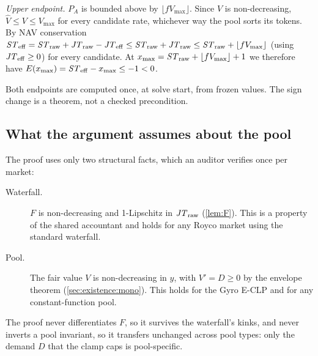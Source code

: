 \emph{Upper endpoint.} $P_A$ is bounded above by $\lfloor f V_{\max}
\rfloor$. Since $V$ is
non-decreasing, $\widehat V \leq V \leq V_{\max}$ for every candidate
rate, whichever way the pool sorts its tokens. By NAV conservation
$\mathit{ST}_{\mathrm{eff}} = \mathit{ST}_{\mathrm{raw}} + \mathit{JT}_{\mathrm{raw}} - \mathit{JT}_{\mathrm{eff}} \leq \mathit{ST}_{\mathrm{raw}}
+ \mathit{JT}_{\mathrm{raw}} \leq \mathit{ST}_{\mathrm{raw}} + \lfloor f V_{\max}\rfloor$ (using $\mathit{JT}_{\mathrm{eff}} \geq
0$) for every candidate. At
$x_{\max} = \mathit{ST}_{\mathrm{raw}} + \lfloor f V_{\max}\rfloor + 1$ we therefore have
$E(x_{\max}) = \mathit{ST}_{\mathrm{eff}} - x_{\max} \leq -1 < 0$.

Both endpoints are computed once, at solve start, from frozen values.
The sign change is a theorem, not a checked precondition.

\subsection{What the argument assumes about the pool}
\label{sec:existence:generality}

The proof uses only two structural facts, which an auditor verifies once
per market:

\begin{description}
  \item[Waterfall.] $F$ is non-decreasing and 1-Lipschitz in $\mathit{JT}_{\mathrm{raw}}$
    (\cref{lem:F}). This is a property of the shared accountant and holds
    for any Royco market using the standard waterfall.
  \item[Pool.] The fair value $V$ is non-decreasing in $y$, with
    $V' = D \geq 0$ by the envelope theorem (\cref{sec:existence:mono}).
    This holds for the Gyro E-CLP and for any constant-function pool.
\end{description}

The proof never differentiates $F$, so it survives the
waterfall's kinks, and never inverts a pool invariant, so it transfers
unchanged across pool types: only the demand $D$ that the clamp caps is
pool-specific.
